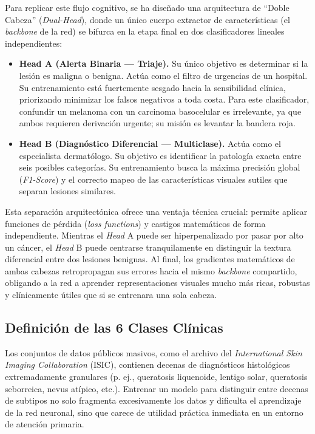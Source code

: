 Para replicar este flujo cognitivo, se ha diseñado una arquitectura de ``Doble Cabeza'' (\textit{Dual-Head}), donde un único cuerpo extractor de características (el \textit{backbone} de la red) se bifurca en la etapa final en dos clasificadores lineales independientes:

\begin{itemize}
	\item \textbf{Head A (Alerta Binaria --- Triaje).} Su único objetivo es determinar si la lesión es maligna o benigna. Actúa como el filtro de urgencias de un hospital. Su entrenamiento está fuertemente sesgado hacia la sensibilidad clínica, priorizando minimizar los falsos negativos a toda costa. Para este clasificador, confundir un melanoma con un carcinoma basocelular es irrelevante, ya que ambos requieren derivación urgente; su misión es levantar la bandera roja.
	
	\item \textbf{Head B (Diagnóstico Diferencial --- Multiclase).} Actúa como el especialista dermatólogo. Su objetivo es identificar la patología exacta entre seis posibles categorías. Su entrenamiento busca la máxima precisión global (\textit{F1-Score}) y el correcto mapeo de las características visuales sutiles que separan lesiones similares.
\end{itemize}

Esta separación arquitectónica ofrece una ventaja técnica crucial: permite aplicar funciones de pérdida (\textit{loss functions}) y castigos matemáticos de forma independiente. Mientras el \textit{Head} A puede ser hiperpenalizado por pasar por alto un cáncer, el \textit{Head} B puede centrarse tranquilamente en distinguir la textura diferencial entre dos lesiones benignas. Al final, los gradientes matemáticos de ambas cabezas retropropagan sus errores hacia el mismo \textit{backbone} compartido, obligando a la red a aprender representaciones visuales mucho más ricas, robustas y clínicamente útiles que si se entrenara una sola cabeza.

\subsection{Definición de las 6 Clases Clínicas}

Los conjuntos de datos públicos masivos, como el archivo del \textit{International Skin Imaging Collaboration} (ISIC), contienen decenas de diagnósticos histológicos extremadamente granulares (p. ej., queratosis liquenoide, lentigo solar, queratosis seborreica, nevus atípico, etc.). Entrenar un modelo para distinguir entre decenas de subtipos no solo fragmenta excesivamente los datos y dificulta el aprendizaje de la red neuronal, sino que carece de utilidad práctica inmediata en un entorno de atención primaria.

